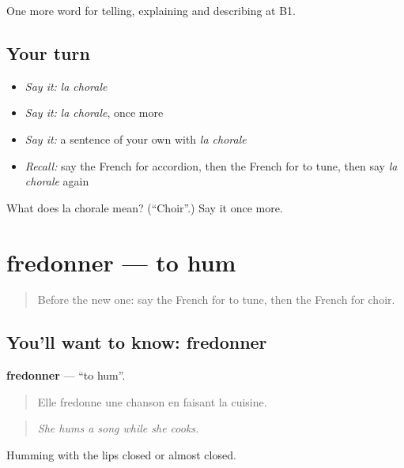 \begin{grammarlens}[title={What you've built}]
One more word for telling, explaining and describing at B1.
\end{grammarlens}

\subsection*{Your turn}
\begin{itemize}
\raggedright
  \item \emph{Say it:} \emph{la chorale}
  \item \emph{Say it:} \emph{la chorale}, once more
  \item \emph{Say it:} a sentence of your own with \emph{la chorale}
  \item \emph{Recall:} say the French for accordion, then the French for to tune, then say \emph{la chorale} again
\end{itemize}

\begin{tcolorbox}[breakable,colback=teal!4,colframe=teal!35!black,title={Before you move on}]
What does la chorale mean? (\textquotedblleft{}Choir\textquotedblright{}.) Say it once more.
\end{tcolorbox}
\section[fredonner]{fredonner — to hum}

\label{lesson:FR-C512-fredonner}



\begin{quote}
Before the new one: say the French for to tune, then the French for choir.
\end{quote}

\subsection*{You'll want to know: fredonner}
\textbf{fredonner} — \textquotedblleft{}to hum\textquotedblright{}.

\begin{quote}
Elle fredonne une chanson en faisant la cuisine.
\end{quote}

\begin{quote}
\emph{She hums a song while she cooks.}
\end{quote}

Humming with the lips closed or almost closed.

